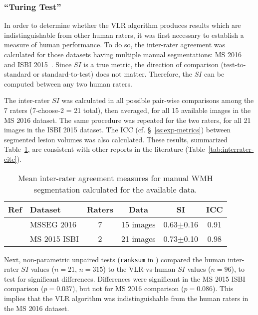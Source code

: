\subsubsection{``Turing Test''}\label{sss:exp-turing}
In order to determine whether the VLR algorithm produces results which are indistinguishable
from other human raters, it was first necessary to establish a measure of human performance.
To do so, the inter-rater agreement was calculated for those datasets
having multiple manual segmentations: MS 2016~\cite{MSSEG2016} and ISBI 2015~\cite{MSISBI2015}.
Since $SI$ is a true metric,
the direction of comparison (test-to-standard or standard-to-test) does not matter.
Therefore, the $SI$ can be computed between any two human raters.
\par
The inter-rater $SI$ was calculated in all possible pair-wise comparisons among the 7 raters
(7-choose-2 = 21 total), then averaged, for all 15 available images in the MS 2016 dataset.
The same procedure was repeated for the two raters, for all 21 images in the ISBI 2015 dataset.
The ICC (cf. \S~\ref{ss:exp-metrics}) between segmented lesion volumes was also calculated.
These results, summarized Table~\ref{tab:interrater-inhouse},
are consistent with other reports in the literature (Table~\ref{tab:interrater-cite}).
\par
\begin{table}
  \centering
  \caption{Mean inter-rater agreement measures
    for manual WMH segmentation calculated for the available data.}%
  \label{tab:interrater-inhouse}
  \begin{tabular}{clcccc}
    \toprule
    Ref & Dataset & Raters & Data & SI & ICC \\
    \midrule
    \cite{MSSEG2016}  & MSSEG 2016   &  7  & 15 images & 0.63$\pm$0.16 & 0.91 \\ %
    \cite{MSISBI2015} & MS 2015 ISBI &  2  & 21 images & 0.73$\pm$0.10 & 0.98 \\ %
    \bottomrule
  \end{tabular}
\end{table}
Next, non-parametric unpaired tests (\texttt{ranksum} in \matlab) compared
the human inter-rater $SI$ values ($n=21$, $n=315$)
to the VLR-vs-human $SI$ values ($n=96$),
to test for significant differences.
Differences were significant in the MS 2015 ISBI comparison ($p = 0.037$),
but not for MS 2016 comparison ($p = 0.086$).
This implies that the VLR algorithm was indistinguishable from the human raters
in the MS 2016 dataset.
